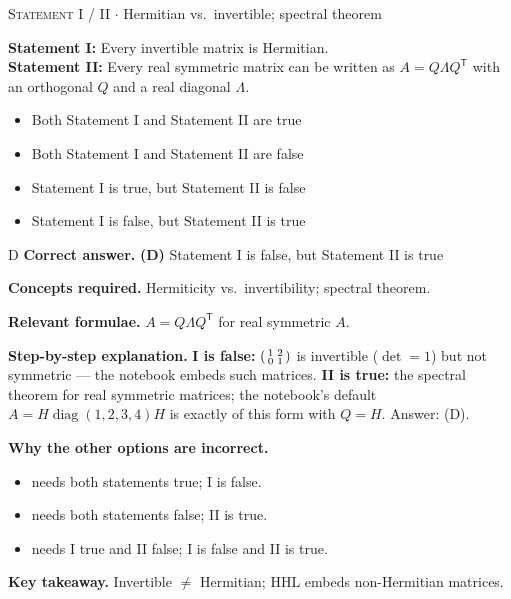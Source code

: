 \documentclass[11pt,a4paper]{article}
\newcommand{\optlabel}[1]{\textbf{(#1)}}
\newcommand{\correctlabel}[1]{\textcolor{okgreen}{\textbf{(#1)}\,\ding{51}}}
\newenvironment{qitem}[1]{\begin{list}{}{\setlength{\leftmargin}{3.3em}\setlength{\labelwidth}{3.1em}%
  \setlength{\labelsep}{0.2em}\setlength{\topsep}{3pt}\setlength{\parsep}{3pt}}\item[\textbf{Q.#1}\hfill]}{\end{list}}
\newcommand{\qsep}{\par\vspace{2pt}{\color{black!15}\hrule}\vspace{4pt}}
\newcommand{\qmeta}[2]{{\footnotesize\color{black!60}\textsc{#1} \;$\cdot$\; #2}\par}
\begin{document}
\begin{qitem}{8}
\qmeta{Statement I / II}{Hermitian vs.\ invertible; spectral theorem}
\textbf{Statement I:} Every invertible matrix is Hermitian.\\[1mm]
\textbf{Statement II:} Every real symmetric matrix can be written as $A = Q\Lambda Q^{\mathsf T}$ with an orthogonal $Q$ and a real diagonal $\Lambda$.
\begin{itemize}[leftmargin=2.6em, labelsep=0.4em, itemsep=2pt, topsep=3pt]
\item[\optlabel{A}] Both Statement I and Statement II are true
\item[\optlabel{B}] Both Statement I and Statement II are false
\item[\optlabel{C}] Statement I is true, but Statement II is false
\item[\correctlabel{D}] Statement I is false, but Statement II is true
\end{itemize}
\end{qitem}
\begin{solbox}{D}
\textbf{\color{brand}Correct answer.} \textcolor{okgreen}{\textbf{(D)}} Statement I is false, but Statement II is true

\textbf{\color{brand}Concepts required.} Hermiticity vs.\ invertibility; spectral theorem.

\textbf{\color{brand}Relevant formulae.} $A = Q\Lambda Q^{\mathsf T}$ for real symmetric $A$.

\textbf{\color{brand}Step-by-step explanation.} \textbf{I is false:} $\begin{psmallmatrix}1&2\\0&1\end{psmallmatrix}$ is invertible ($\det = 1$) but not symmetric --- the notebook embeds such matrices.
\textbf{II is true:} the spectral theorem for real symmetric matrices; the notebook's default $A = H\operatorname{diag}(1,2,3,4)H$ is exactly of this form with $Q = H$.
Answer: (D).

\textbf{\color{brand}Why the other options are incorrect.}
\begin{itemize}[leftmargin=2.4em, itemsep=1pt, topsep=2pt]
\item[\textbf{(A)}] needs both statements true; I is false.
\item[\textbf{(B)}] needs both statements false; II is true.
\item[\textbf{(C)}] needs I true and II false; I is false and II is true.
\end{itemize}
\textbf{\color{brand}Key takeaway.} Invertible $\ne$ Hermitian; HHL embeds non-Hermitian matrices.
\end{solbox}
\qsep
\end{document}
